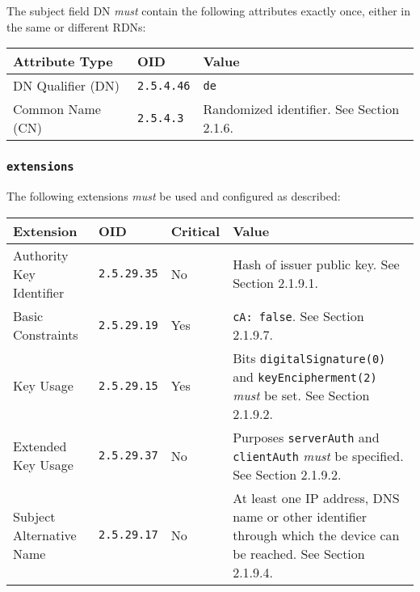 The subject field DN \textit{must} contain the following attributes exactly once, either in the same or different RDNs:

\vspace*{0.5cm}
\noindent\begin{tabularx}{\textwidth}{| p{4cm} | p{2cm} | X |} \hline
\rowcolor{gray!33} Attribute Type & OID               & Value \\ \hline

DN Qualifier (DN)                 & \texttt{2.5.4.46} & \texttt{de} \\ \hline
Common Name (CN)                  & \texttt{2.5.4.3}  &  Randomized identifier. See Section 2.1.6. \\ \hline

\end{tabularx}
\vspace*{0.5cm}

\subsubsection{\texttt{extensions}}

The following extensions \textit{must} be used and configured as described:

\vspace*{0.5cm}
\noindent\begin{tabularx}{\textwidth}{| p{4cm} | p{2cm} | p{1.2cm} | X |} \hline
\rowcolor{gray!33} Extension & OID                & Critical & Value \\ \hline

Authority Key Identifier     & \texttt{2.5.29.35} & No       & Hash of issuer public key. See Section 2.1.9.1. \\ \hline
Basic Constraints            & \texttt{2.5.29.19} & Yes      & \texttt{cA: false}. See Section 2.1.9.7. \\ \hline
Key Usage                    & \texttt{2.5.29.15} & Yes      & Bits \texttt{digitalSignature(0)} and \texttt{keyEncipherment(2)} \textit{must} be set. See Section 2.1.9.2. \\ \hline
Extended Key Usage           & \texttt{2.5.29.37} & No       & Purposes \texttt{serverAuth} and \texttt{clientAuth} \textit{must} be specified. See Section 2.1.9.2. \\ \hline
Subject Alternative Name     & \texttt{2.5.29.17} & No       & At least one IP address, DNS name or other identifier through which the device can be reached. See Section 2.1.9.4. \\ \hline

\end{tabularx}
\vspace*{0.5cm}


